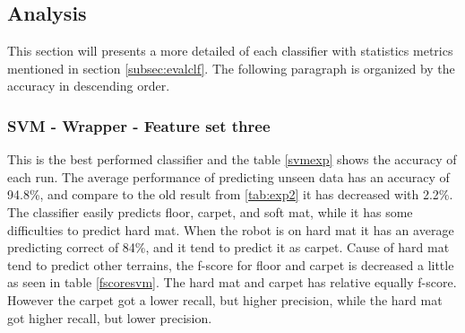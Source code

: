 \documentclass[USenglish]{ifimaster}  %
\begin{document}
\subsection{Analysis}
This section will presents a more detailed of each classifier with statistics metrics mentioned in section \ref{subsec:evalclf}. The following paragraph is organized by the accuracy in descending order.
\newpage

\subsubsection{SVM - Wrapper - Feature set three}
This is the best performed classifier and the table \ref{svmexp} shows the accuracy of each run. The average performance of predicting unseen data has an accuracy of 94.8\%, and compare to the old result from \ref{tab:exp2} it has decreased with 2.2\%. The classifier easily predicts floor, carpet, and soft mat, while it has some difficulties to predict hard mat. When the robot is on hard mat it has an average predicting correct of 84\%, and it tend to predict it as carpet. Cause of hard mat tend to predict other terrains, the f-score for floor and carpet is decreased a little as seen in table \ref{fscoresvm}. The hard mat and carpet has relative equally f-score. However the carpet got a lower recall, but higher precision, while the hard mat got higher recall, but lower precision. 
\end{document}
